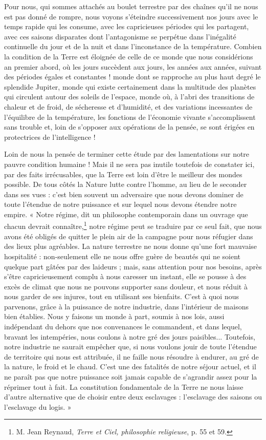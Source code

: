 \documentclass[a4paper, 11pt, oneside, landscape]{article}
\begin{document}
Pour nous, qui sommes attachés au boulet terrestre par des chaînes qu'il ne nous est pas donné de rompre, nous voyons s'éteindre successivement nos jours avec le temps rapide qui les consume, avec les capricieuses périodes qui les partagent, avec ces saisons disparates dont l'antagonisme se perpétue dans l'inégalité continuelle du jour et de la nuit et dans l'inconstance de la température. Combien la condition de la Terre est éloignée de celle de ce monde que nous considérions an premier abord, où les jours succèdent aux jours, les années aux années, suivant des périodes égales et constantes ! monde dont se rapproche au plus haut degré le splendide Jupiter, monde qui existe certainement dans la multitude des planètes qui circulent autour des soleils de l'espace, monde où, à l'abri des transitions de chaleur et de froid, de sécheresse et d'humidité, et des variations incessantes de l'équilibre de la température, les fonctions de l'économie vivante s'accomplissent sans trouble et, loin de s'opposer aux opérations de la pensée, se sont érigées en protectrices de l'intelligence !

Loin de nous la pensée de terminer cette étude par des lamentations sur notre pauvre condition humaine ! Mais il ne sera pas inutile toutefois de constater ici, par des faits irrécusables, que la Terre est loin d'être le meilleur des mondes possible. De tous côtés la Nature lutte contre l'homme, au lieu de le seconder dans ses vues : c'est bien souvent un adversaire que nous devons dominer de toute l'étendue de notre puissance et sur lequel nous devons étendre notre empire. « Notre régime, dit un philosophe contemporain dans un ouvrage que chacun devrait connaître,\footnote{M. Jean Reynaud, \emph{Terre et Ciel, philosophie religieuse}, p. 55 et 59.} notre régime peut se traduire par ce seul fait, que nous avons été obligés de quitter le plein air de la campagne pour nous réfugier dans des lieux plus agréables. La nature terrestre ne nous donne qu'une fort mauvaise hospitalité : non-seulement elle ne nous offre guère de beautés qui ne soient quelque part gâtées par des laideurs ; mais, sans attention pour nos besoins, après s'être capricieusement complu à nous caresser un instant, elle se pousse à des excès de climat que nous ne pouvons supporter sans douleur, et nous réduit à nous garder de ses injures, tout en utilisant ses bienfaits. C'est à quoi nous parvenons, grâce à la puissance de notre industrie, dans l'intérieur de maisons bien établies. Nous y faisons un monde à part, soumis à nos lois, aussi indépendant du dehors que nos convenances le commandent, et dans lequel, bravant les intempéries, nous coulons à notre gré des jours paisibles... Toutefois, notre industrie ne saurait empêcher que, si nous voulons jouir de toute l'étendue de territoire qui nous est attribuée, il ne faille nous résoudre à endurer, au gré de la nature, le froid et le chaud. C'est une des fatalités de notre séjour actuel, et il ne paraît pas que notre puissance soit jamais capable de s'agrandir assez pour la réprimer tout à fait. La constitution fondamentale de la Terre ne nous laisse d'autre alternative que de choisir entre deux esclavages : l'esclavage des saisons ou l'esclavage du logis. »
\end{document}
